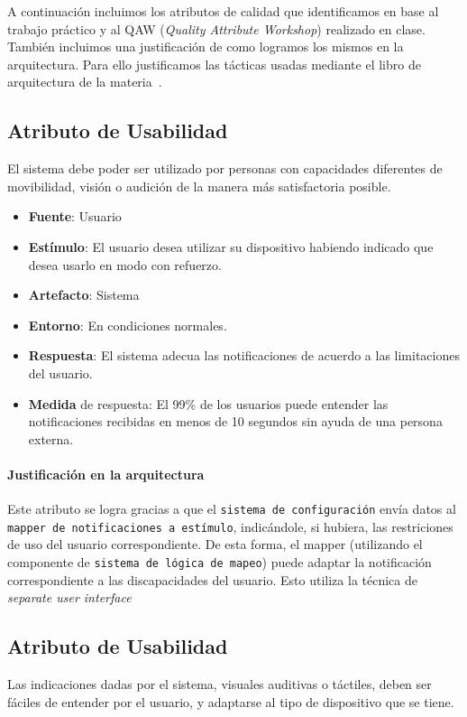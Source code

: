 A continuación incluimos los atributos de calidad que identificamos en base al trabajo práctico y
al QAW (\textit{Quality Attribute Workshop}) realizado en clase. También incluimos una justificación de como
logramos los mismos en la arquitectura. Para ello justificamos las tácticas usadas mediante el libro de 
arquitectura de la materia~\cite{lenbass}.

\subsection{Atributo de Usabilidad}
El sistema debe poder ser utilizado por personas con capacidades diferentes de movibilidad, visión o audición de la manera más satisfactoria posible.

\begin{itemize}
  \item \textbf{Fuente}: Usuario
  \item \textbf{Estímulo}: El usuario desea utilizar su dispositivo habiendo indicado que desea usarlo en modo con refuerzo.
  \item \textbf{Artefacto}: Sistema
  \item \textbf{Entorno}: En condiciones normales.
  \item \textbf{Respuesta}: El sistema adecua las notificaciones de acuerdo a las limitaciones del usuario.
  \item \textbf{Medida} de respuesta: El 99\% de los usuarios puede entender las notificaciones recibidas en menos de 10 segundos sin ayuda de una persona externa.
\end{itemize}

\paragraph{Justificación en la arquitectura}
Este atributo se logra gracias a que el \texttt{sistema de configuración} envía datos al \texttt{mapper de notificaciones a estímulo}, indicándole, si hubiera, las restriciones de uso del usuario correspondiente. De esta forma, el mapper (utilizando el componente de \texttt{sistema de lógica de mapeo}) puede adaptar la notificación correspondiente a las discapacidades del usuario. Esto utiliza la técnica de \emph{separate user interface}


\subsection{Atributo de Usabilidad}
Las indicaciones dadas por el sistema, visuales auditivas o táctiles, deben ser fáciles de entender por el usuario, y adaptarse al tipo de dispositivo que se tiene.

